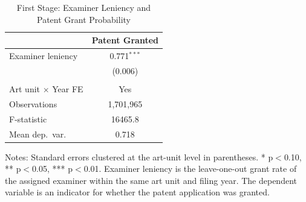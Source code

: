 \begin{table}[H]
\centering
\caption{First Stage: Examiner Leniency and Patent Grant Probability}
\begin{threeparttable}
\begin{tabular}{lc}
\toprule
 & Patent Granted \\
\midrule
Examiner leniency & 0.771$^{***}$ \\
 & (0.006) \\
 & \\
Art unit $\times$ Year FE & Yes \\
Observations & 1,701,965 \\
F-statistic & 16465.8 \\
Mean dep.\ var. & 0.718 \\
\bottomrule
\end{tabular}
\begin{tablenotes}[flushleft]
\small
\item Notes: Standard errors clustered at the art-unit level in parentheses. * p$<$0.10, ** p$<$0.05, *** p$<$0.01. Examiner leniency is the leave-one-out grant rate of the assigned examiner within the same art unit and filing year. The dependent variable is an indicator for whether the patent application was granted.
\end{tablenotes}
\end{threeparttable}
\label{tab:first_stage}
\end{table}

